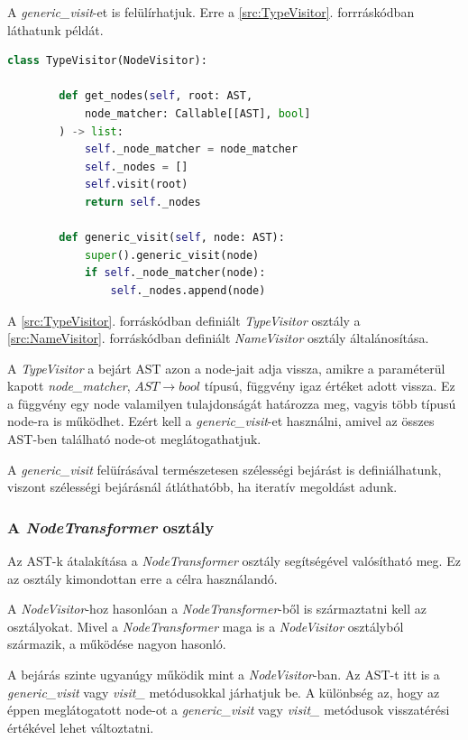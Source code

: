 A \emph{generic\_visit}-et is felülírhatjuk.
Erre a \ref{src:TypeVisitor}. forrráskódban láthatunk példát.

\begin{lstlisting}[language={Python}]
	class TypeVisitor(NodeVisitor):
		
		def get_nodes(self, root: AST,
			node_matcher: Callable[[AST], bool]
		) -> list:
			self._node_matcher = node_matcher
			self._nodes = []
			self.visit(root)
			return self._nodes
		
		def generic_visit(self, node: AST):
			super().generic_visit(node)
			if self._node_matcher(node):
				self._nodes.append(node)
\end{lstlisting}


A \ref{src:TypeVisitor}. forráskódban definiált \emph{TypeVisitor} osztály
a \ref{src:NameVisitor}. forráskódban definiált \emph{NameVisitor} osztály
általánosítása.

A \emph{TypeVisitor} a bejárt AST azon a node-jait adja vissza,
amikre a paraméterül kapott \emph{node\_matcher}, $AST \rightarrow bool$ típusú,
függvény igaz értéket adott vissza.
Ez a függvény egy node valamilyen tulajdonságát határozza meg,
vagyis több típusú node-ra is működhet.
Ezért kell a \emph{generic\_visit}-et használni,
amivel az összes AST-ben található node-ot meglátogathatjuk.

A \emph{generic\_visit} felüírásával természetesen szélességi bejárást is definiálhatunk,
viszont szélességi bejárásnál átláthatóbb, ha iteratív megoldást adunk.

\subsubsection{A \emph{NodeTransformer} osztály}

Az AST-k átalakítása a \emph{NodeTransformer} osztály segítségével valósítható meg.
Ez az osztály kimondottan erre a célra használandó.

A \emph{NodeVisitor}-hoz hasonlóan a \emph{NodeTransformer}-ből is származtatni
kell az osztályokat.
Mivel a \emph{NodeTransformer} maga is a \emph{NodeVisitor} osztályból származik,
a működése nagyon hasonló.

A bejárás szinte ugyanúgy működik mint a \emph{NodeVisitor}-ban.
Az AST-t itt is a \emph{generic\_visit} vagy \emph{visit\_<node-class>} metódusokkal
járhatjuk be.
A különbség az, hogy az éppen meglátogatott node-ot a
\emph{generic\_visit} vagy \emph{visit\_<node-class>}
metódusok visszatérési értékével lehet változtatni. 

